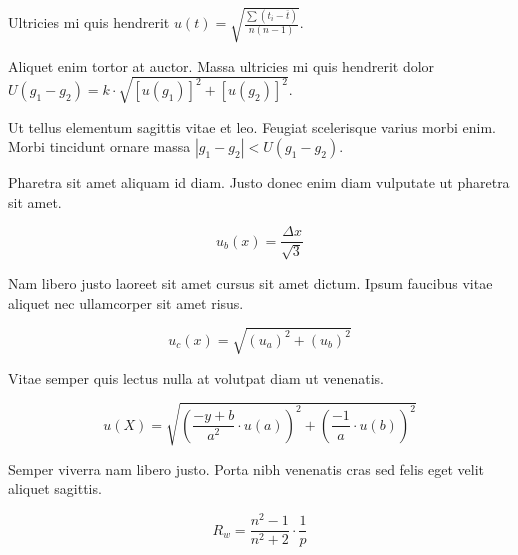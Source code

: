 \documentclass{article}
\begin{document}
Ultricies mi quis hendrerit \begin{math}
	u(t)=\sqrt{\frac{\sum(t_i-\overline{t})}{n(n-1)}}
\end{math}.\newline

Aliquet enim tortor at auctor. Massa ultricies mi quis hendrerit dolor $ U(g_1-g_2)=k\cdot \sqrt{[u(g_1)]^2+[u(g_2)]^2} $.\newline

Ut tellus elementum sagittis vitae et leo. Feugiat scelerisque varius morbi enim. Morbi tincidunt ornare massa \( |g_1-g_2|<U(g_1-g_2) \).\newline

Pharetra sit amet aliquam id diam. Justo donec enim diam vulputate ut pharetra sit amet.

\[ u_b(x)=\frac{\Delta x}{\sqrt{3}} \]

Nam libero justo laoreet sit amet cursus sit amet dictum. Ipsum faucibus vitae aliquet nec ullamcorper sit amet risus.

$$ u_c(x)=\sqrt{(u_a)^2+(u_b)^2} $$

Vitae semper quis lectus nulla at volutpat diam ut venenatis.

\begin{displaymath}
	u(X)=\sqrt{(\frac{-y+b}{a^2}\cdot u(a))^2+(\frac{-1}{a}\cdot u(b))^2}
\end{displaymath}

Semper viverra nam libero justo. Porta nibh venenatis cras sed felis eget velit aliquet sagittis.

\begin{equation}
	R_w=\frac{n^2-1}{n^2+2} \cdot \frac{1}{p}
\end{equation}
\end{document}
